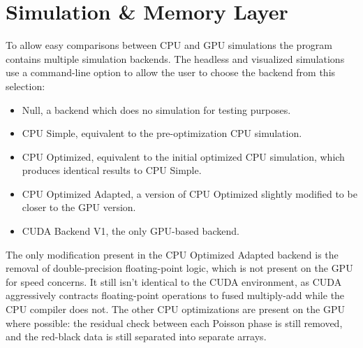 \section{Simulation \& Memory Layer}

To allow easy comparisons between CPU and GPU simulations the program contains multiple simulation backends.
The headless and visualized simulations use a  command-line option to allow the user to choose the backend from this selection:\label{sec:DesignBackends}
\begin{itemize}
    \item Null, a backend which does no simulation for testing purposes.
    \item CPU Simple, equivalent to the pre-optimization CPU simulation.
    \item CPU Optimized, equivalent to the initial optimized CPU simulation, which produces identical results to CPU Simple.%
    \item CPU Optimized Adapted, a version of CPU Optimized slightly modified to be closer to the GPU version.
    \item CUDA Backend V1, the only GPU-based backend.
\end{itemize}

The only modification present in the CPU Optimized Adapted backend is the removal of double-precision floating-point logic, which is not present on the GPU for speed concerns.
It still isn't identical to the CUDA environment, as CUDA aggressively contracts floating-point operations to fused multiply-add while the CPU compiler does not.
The other CPU optimizations are present on the GPU where possible: the residual check between each Poisson phase is still removed, and the red-black data is still separated into separate arrays. 

